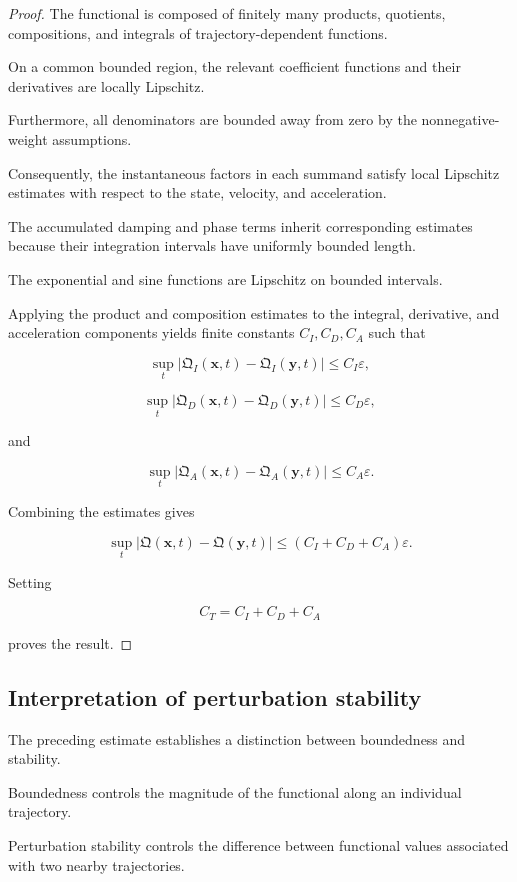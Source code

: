 \documentclass[12pt]{article}
\numberwithin{equation}{section}
\newcommand{\Q}{\mathfrak{Q}}
\newcommand{\eps}{\varepsilon}
\theoremstyle{definition}
\theoremstyle{remark}
\begin{document}
\begin{proof}

The functional is composed of finitely many
products, quotients, compositions, and
integrals of trajectory-dependent functions.

On a common bounded region, the relevant
coefficient functions and their derivatives
are locally Lipschitz.

Furthermore, all denominators are bounded
away from zero by the nonnegative-weight
assumptions.

Consequently, the instantaneous factors
in each summand satisfy local Lipschitz
estimates with respect to the state,
velocity, and acceleration.

The accumulated damping and phase terms
inherit corresponding estimates because
their integration intervals have uniformly
bounded length.

The exponential and sine functions are
Lipschitz on bounded intervals.

Applying the product and composition
estimates to the integral, derivative,
and acceleration components yields
finite constants \(C_I,C_D,C_A\) such that

\[
\sup_t
|\Q_I(\mathbf{x},t)-\Q_I(\mathbf{y},t)|
\leq C_I\eps,
\]

\[
\sup_t
|\Q_D(\mathbf{x},t)-\Q_D(\mathbf{y},t)|
\leq C_D\eps,
\]

and

\[
\sup_t
|\Q_A(\mathbf{x},t)-\Q_A(\mathbf{y},t)|
\leq C_A\eps.
\]

Combining the estimates gives

\[
\sup_t
|\Q(\mathbf{x},t)-\Q(\mathbf{y},t)|
\leq
(C_I+C_D+C_A)\eps.
\]

Setting

\[
C_T=C_I+C_D+C_A
\]

proves the result.

\end{proof}

\subsection{Interpretation of perturbation stability}

The preceding estimate establishes a
distinction between boundedness and stability.

Boundedness controls the magnitude of
the functional along an individual trajectory.

Perturbation stability controls the difference
between functional values associated with
two nearby trajectories.
\end{document}
